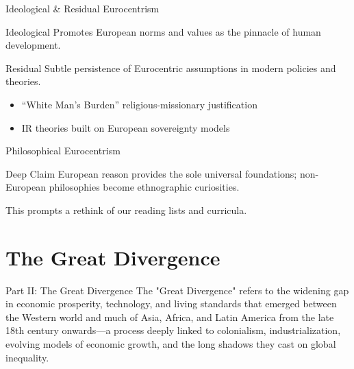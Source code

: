 \documentclass[aspectratio=169]{beamer}
\begin{document}
\begin{frame}{Ideological \& Residual Eurocentrism}
  \begin{block}{Ideological}
    Promotes European norms and values as the pinnacle of human development.
  \end{block}
  \vspace{0.5em}
  \begin{block}{Residual}
    Subtle persistence of Eurocentric assumptions in modern policies and theories.
  \end{block}
  \vspace{0.5em}
  \begin{itemize}[<+->]
    \item “White Man’s Burden” religious-missionary justification  
    \item IR theories built on European sovereignty models  
  \end{itemize}
\end{frame}

\begin{frame}{Philosophical Eurocentrism}
  \begin{block}{Deep Claim}
    European reason provides the sole universal foundations; non-European philosophies become ethnographic curiosities.
  \end{block}
  \vspace{0.5em}
  This prompts a rethink of our reading lists and curricula.
\end{frame}

\section{The Great Divergence}

\begin{frame}{Part II: The Great Divergence}
	The "Great Divergence" refers to the widening gap in economic prosperity, technology, and
living standards that emerged between the Western world and much of Asia, Africa, and
Latin America from the late 18th century onwards—a process deeply linked to colonialism,
industrialization, evolving models of economic growth, and the long shadows they cast on
global inequality.
\end{frame}
\end{document}
